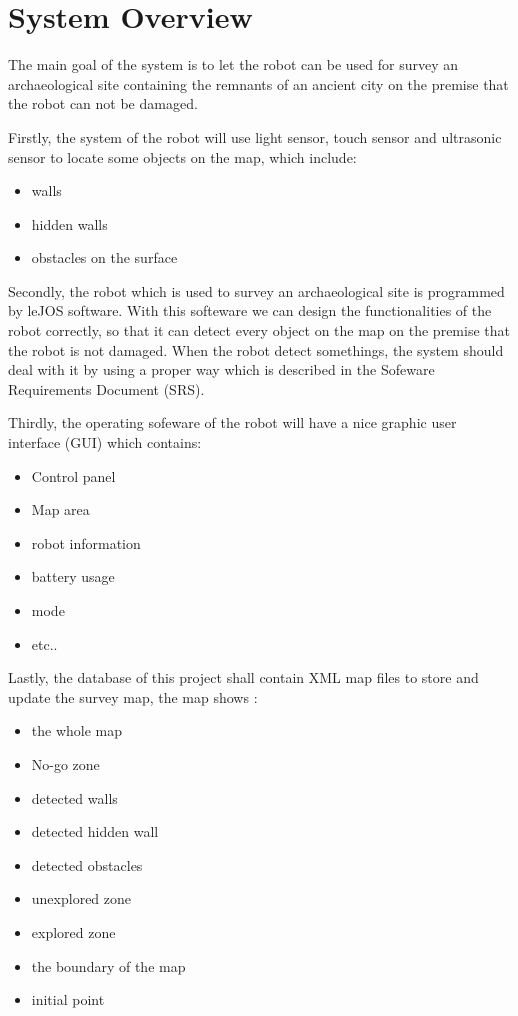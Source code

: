 \documentclass[11pt, a4paper]{report}
\begin{document}
\chapter{System Overview}%
\label{cha:SO}
The main goal of the system is to let the robot can be used for survey an archaeological site containing the remnants of an ancient city on the premise that the robot can not be damaged.
\par\vspace{\baselineskip}
\par\vspace{\baselineskip}
 Firstly, the system of the robot will use light sensor, touch sensor and ultrasonic sensor to locate some objects on the map, which include:
\begin{itemize}
  \item walls
  \item hidden walls 
  \item obstacles on the surface
\end{itemize}
Secondly, the robot which is used to survey an archaeological site is programmed by leJOS software. With this softeware we can design the functionalities of the robot correctly, so that it can detect every object on the map on the premise that the robot is not damaged. When the robot detect somethings, the system should deal with it by using a proper way which is described in the Sofeware Requirements Document (SRS).
\par\vspace{\baselineskip}
\par\vspace{\baselineskip}
Thirdly, the operating sofeware of the robot will have a nice graphic user interface (GUI) which contains:
\begin{itemize}
  \item Control panel
  \item Map area
  \item robot information
  \item battery usage
  \item mode
  \item etc..
\end{itemize}
Lastly, the database of this project shall contain XML map files to store and update the survey map, the map shows :
\begin{itemize}
  \item the whole map
  \item No-go zone
  \item detected walls
  \item detected hidden wall
  \item detected obstacles
  \item unexplored zone
  \item explored zone
  \item the boundary of the map
  \item initial point
\end{itemize}
\end{document}
